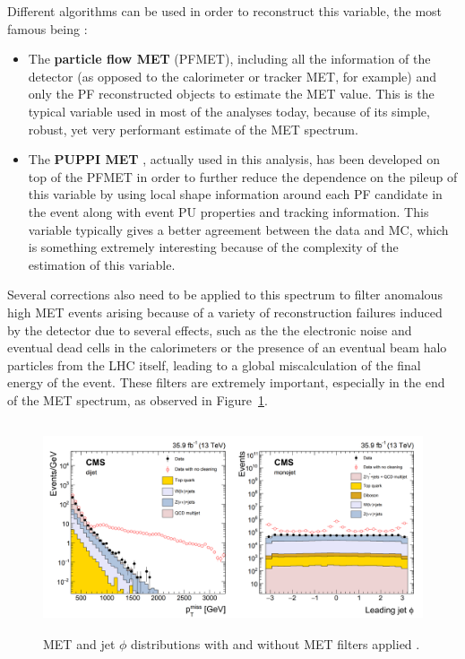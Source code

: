 \documentclass[a4paper, 10pt, openright]{report}
\begin{document}
Different algorithms can be used in order to reconstruct this variable, the most famous being \cite{METReco}:
\begin{itemize}
\item The \textbf{particle flow \ac{MET}} (PFMET), including all the information of the detector (as opposed to the calorimeter or tracker \ac{MET}, for example) and only the \ac{PF} reconstructed objects to estimate the \ac{MET} value. This is the typical variable used in most of the analyses today, because of its simple, robust, yet very performant estimate of the \ac{MET} spectrum.
\item The \textbf{\ac{PUPPI} \ac{MET}} \cite{PUPPI}, actually used in this analysis, has been developed on top of the PFMET in order to further reduce the dependence on the pileup of this variable by using local shape information around each \ac{PF} candidate in the event along with event \ac{PU} properties and tracking information. This variable typically gives a better agreement between the data and \ac{MC}, which is something extremely interesting because of the complexity of the estimation of this variable.
\end{itemize}

Several corrections also need to be applied to this spectrum to filter anomalous high \ac{MET} events arising because of a variety of reconstruction failures induced by the detector due to several effects, such as the the electronic noise and eventual dead cells in the calorimeters or the presence of an eventual beam halo particles from the \ac{LHC} itself, leading to a global miscalculation of the final energy of the event. These filters are extremely important, especially in the end of the \ac{MET} spectrum, as observed in Figure~\ref{fig:METFilters}.

\begin{figure}[htbp]
\begin{center}
\includegraphics[width=14cm, height=6.2cm]{figs/METFilters.png}
\caption{\ac{MET} and jet $\phi$ distributions with and without \ac{MET} filters applied \cite{METReco}.}
\label{fig:METFilters}
\end{center}
\end{figure}
\end{document}
